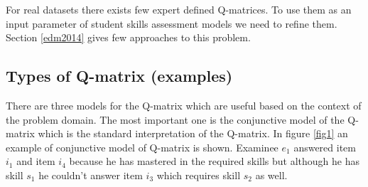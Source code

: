 For real datasets there exists few expert defined Q-matrices. To use them as an input parameter of student skills assessment models we need to refine them. Section \ref{edm2014} gives few approaches to this problem.


\subsection{Types of Q-matrix (examples) }

There are three models for the Q-matrix which are useful based on the context of the problem domain. The most important one is the conjunctive model of the Q-matrix which is the standard interpretation of the Q-matrix. In figure \ref{fig1} an example of conjunctive model of Q-matrix is shown. Examinee $e_{1}$ answered item $i_{1}$ and item $i_{4}$ because he has mastered in the required skills but although he has skill $s_{1}$ he couldn't answer item $i_{3}$ which requires skill $s_{2}$ as well.

